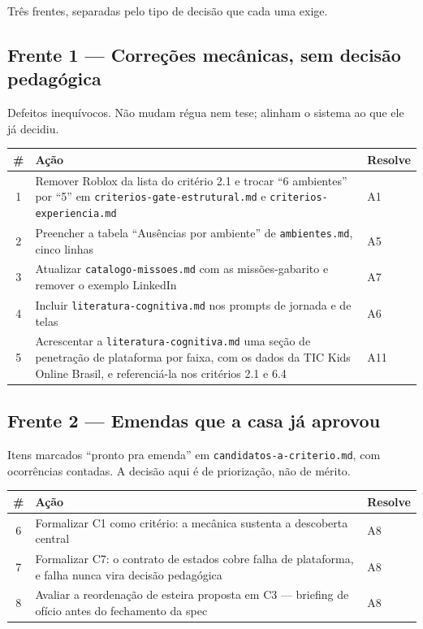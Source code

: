 \documentclass[11pt,a4paper]{article}
\begin{document}
Tr\^es frentes, separadas pelo tipo de decis\~ao que cada uma exige.

\subsection{Frente 1 --- Corre\c{c}\~oes mec\^anicas, sem decis\~ao pedag\'ogica}

Defeitos inequ\'ivocos. N\~ao mudam r\'egua nem tese; alinham o sistema ao que ele j\'a decidiu.

\begin{center}
\begin{tabular}{@{}c p{9.6cm} l@{}}
\toprule
\textbf{\#} & \textbf{A\c{c}\~ao} & \textbf{Resolve} \\
\midrule
1 & Remover Roblox da lista do crit\'erio 2.1 e trocar ``6 ambientes'' por ``5'' em
    \texttt{criterios-gate-estrutural.md} e \texttt{criterios-experiencia.md} & A1 \\
2 & Preencher a tabela ``Aus\^encias por ambiente'' de \texttt{ambientes.md}, cinco linhas & A5 \\
3 & Atualizar \texttt{catalogo-missoes.md} com as miss\~oes-gabarito e remover o exemplo LinkedIn
  & A7 \\
4 & Incluir \texttt{literatura-cognitiva.md} nos prompts de jornada e de telas & A6 \\
5 & Acrescentar a \texttt{literatura-cognitiva.md} uma se\c{c}\~ao de penetra\c{c}\~ao de
    plataforma por faixa, com os dados da TIC Kids Online Brasil, e referenci\'a-la nos
    crit\'erios 2.1 e 6.4 & A11 \\
\bottomrule
\end{tabular}
\end{center}

\subsection{Frente 2 --- Emendas que a casa j\'a aprovou}

Itens marcados ``pronto pra emenda'' em \texttt{candidatos-a-criterio.md}, com ocorr\^encias
contadas. A decis\~ao aqui \'e de prioriza\c{c}\~ao, n\~ao de m\'erito.

\begin{center}
\begin{tabular}{@{}c p{9.6cm} l@{}}
\toprule
\textbf{\#} & \textbf{A\c{c}\~ao} & \textbf{Resolve} \\
\midrule
6 & Formalizar C1 como crit\'erio: a mec\^anica sustenta a descoberta central & A8 \\
7 & Formalizar C7: o contrato de estados cobre falha de plataforma, e falha nunca vira decis\~ao
    pedag\'ogica & A8 \\
8 & Avaliar a reordena\c{c}\~ao de esteira proposta em C3 --- briefing de of\'icio antes do
    fechamento da spec & A8 \\
\bottomrule
\end{tabular}
\end{center}
\end{document}
